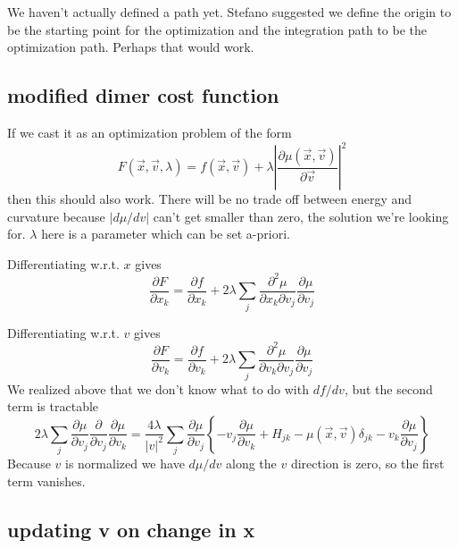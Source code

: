\documentclass[a4paper]{article}
\begin{document}
We haven't actually defined a path yet.
Stefano suggested we define the origin to be the starting point for the
optimization and the integration path to be the optimization path.  Perhaps that would work.


\subsection{modified dimer cost function}

If we cast it as an optimization problem of the form
\begin{equation}
F(\vec{x}, \vec{v}, \lambda) = f(\vec{x}, \vec{v}) + \lambda \left| \frac{\partial \mu(\vec{x}, \vec{v})}{\partial \vec{v}} \right|^2
\end{equation}
then this should also work.  There will be no trade off between energy and curvature because $|d\mu / dv|$ 
can't get smaller than zero, the solution we're looking for.  $\lambda$ here is a parameter which can be set a-priori.  

Differentiating w.r.t. $x$ gives
\begin{equation}
\frac{\partial F}{\partial x_k} = \frac{\partial f}{\partial x_k} +
2 \lambda \sum_j 
\frac{\partial^2 \mu}{\partial x_k \partial v_j} \frac{\partial
\mu}{\partial v_j}
\end{equation}


Differentiating w.r.t. $v$ gives
\begin{equation}
\frac{\partial F}{\partial v_k} = \frac{\partial f}{\partial v_k} +
2 \lambda \sum_j 
\frac{\partial^2 \mu}{\partial v_k \partial v_j} \frac{\partial
\mu}{\partial v_j}
\end{equation}
We realized above that we don't know what to do with $df/dv$, but the second term is tractable
\begin{equation}
2 \lambda \sum_j \frac{\partial \mu}{\partial v_j} \frac{\partial }{\partial v_j }
\frac{\partial \mu}{\partial v_k}
= 
\frac{4 \lambda}{|v|^2}
\sum_j 
\frac{\partial \mu}{\partial v_j} 
\left\{
-v_j \frac{\partial \mu}{\partial v_k}
+
H_{jk}
-
\mu(\vec{x}, \vec{v}) \delta_{jk}
-
v_k \frac{\partial \mu}{\partial v_j}
\right\}
\end{equation}
Because $v$ is normalized we have $d\mu /dv$ along the $v$ direction is zero, so the first term vanishes.

\subsection{updating v on change in x}
\end{document}

